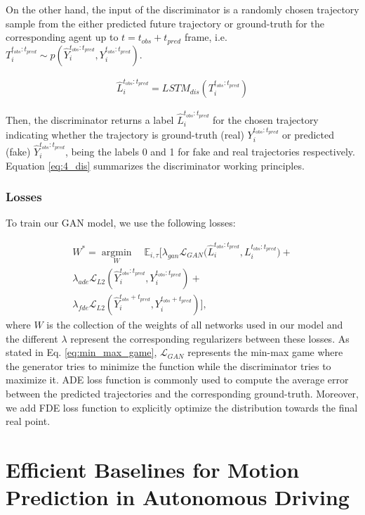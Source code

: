 On the other hand, the input of the discriminator is a randomly chosen trajectory sample from the either predicted future trajectory or ground-truth for the corresponding agent up to $t = t_{obs} + t_{pred}$ frame, i.e.  $T_i^{t_{obs}:t_{pred}}\sim p(\hat{Y}_i^{t_{obs}:t_{pred}},Y_i^{t_{obs}:t_{pred}})$.

\begin{eqnarray}
	\label{eq:4_dis}
	\hat{L}_{i}^{t_{obs}:t_{pred}} = LSTM_{dis}(T_i^{t_{obs}:t_{pred}})
\end{eqnarray}

Then, the discriminator returns a label $\hat{L}_{i}^{t_{obs}:t_{pred}}$ for the chosen trajectory indicating whether the trajectory is ground-truth (real) $Y_i^{t_{obs}:t_{pred}}$ or predicted (fake) $\hat{Y}_i^{t_{obs}:t_{pred}}$, being the labels 0 and 1 for fake and real trajectories respectively. Equation \ref{eq:4_dis} summarizes the discriminator working principles. 

\subsubsection{Losses}

To train our \ac{GAN} model, we use the following losses:

\begin{eqnarray}
	\label{eq:obj}
	W^* =\operatorname*{argmin}_W \quad\mathbb{E}_{i,\tau}[\lambda_{gan} \mathcal{L}_{GAN}\big(\hat{L}_{i}^{t_{obs}:t_{pred}}, L_{i}^{t_{obs}:t_{pred}} \big)+ \nonumber\\
	\lambda_{ade} \mathcal{L}_{L2}(\hat{Y}_i^{t_{obs}:t_{pred}},Y_i^{t_{obs}:t_{pred}})+ \nonumber\\
	\lambda_{fde} \mathcal{L}_{L2}(\hat{Y}_i^{t_{obs}+t_{pred}},Y_i^{t_{obs}+t_{pred}})],
\end{eqnarray}
%
where $W$ is the collection of the weights of all networks used in our model and the different $\lambda$ represent the corresponding regularizers between these losses. As stated in Eq. \ref{eq:min_max_game}, $\mathcal{L}_{GAN}$ represents the min-max game where the generator tries to minimize the function while the discriminator tries to maximize it. ADE loss function is commonly used to compute the average error between the predicted trajectories and the corresponding ground-truth. Moreover, we add FDE loss function to explicitly optimize the distribution towards the final real point.

\section{Efficient Baselines for Motion Prediction in Autonomous Driving}
\label{sec:4_efficient_baselines}

